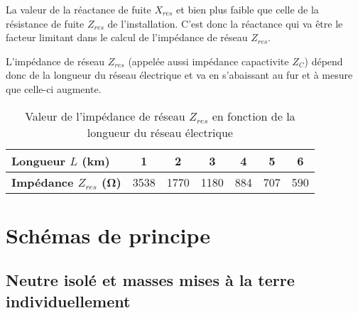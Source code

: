 

La valeur de la réactance de fuite $X_{res}$ et bien plus faible que celle de la résistance de fuite $Z_{res}$ de l'installation. C'est donc la réactance qui va être le facteur limitant dans le calcul de l'impédance de réseau $Z_{res}$.

\begin{figure}[H]
\caption{Impédance de fuite $Z_{res}$ d'un réseau électrique de plusieurs \si{\kilo\meter}}
\begin{subfigure}[t]{0.49\linewidth}

\end{subfigure}
\begin{subfigure}[t]{0.49\linewidth}

\end{subfigure}
\end{figure}

L'impédance de réseau $Z_{res}$ (appelée aussi impédance capactivite $Z_C$) dépend donc de la longueur du réseau électrique et va en s'abaissant au fur et à mesure que celle-ci augmente.

\begin{table}[h]
\caption{Valeur de l'impédance de réseau $Z_{res}$ en fonction de la longueur du réseau électrique}
\begin{tabular}{l c c c c c c}
\toprule
{\small \textbf{Longueur $L$ (\si{\kilo\meter})}} & 1 & 2 & 3 & 4 & 5 & 6 \\
\midrule
{\small \textbf{Impédance $Z_{res}$  (\si{\ohm})}} & 3538 & 1770 & 1180 & 884 & 707 & 590 \\
\bottomrule
\end{tabular}
\end{table}

\section{Schémas de principe}

\subsection{Neutre isolé et masses mises à la terre individuellement}

